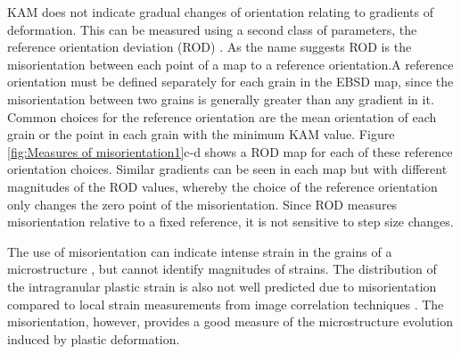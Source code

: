 KAM does not indicate gradual changes of orientation relating to gradients of deformation. This can be measured using a second class of parameters, the reference orientation deviation (ROD) \cite{wright2011review}. As the name suggests ROD is the misorientation between each point of a map to a reference orientation.A reference orientation must be defined separately for each grain in the EBSD map, since the misorientation between two grains is generally greater than any gradient in it. Common choices for the reference orientation are the mean orientation of each grain or the point in each grain with the minimum KAM value. Figure \ref{fig:Measures of misorientation1}c-d shows a ROD map for each of these reference orientation choices. Similar gradients can be seen in each map but with different magnitudes of the ROD values, whereby the choice of the reference orientation only changes the zero point of the misorientation. Since ROD measures misorientation relative to a fixed reference, it is not sensitive to step size changes.

\noindent The use of misorientation can indicate intense strain in the grains of a microstructure \cite{kamaya2006quantification}, but cannot identify magnitudes of strains. The distribution of the intragranular plastic strain is also not well predicted due to misorientation compared to local strain measurements from image correlation techniques \cite{kamaya2007local}. The misorientation, however, provides a good measure of the microstructure evolution induced by plastic deformation.